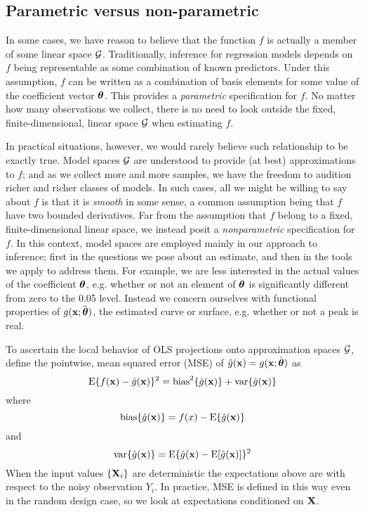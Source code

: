 \subsection{Parametric versus non-parametric}
In some cases, we have reason to believe that the function $f$ is
actually a member of some linear space $\cal G$. Traditionally,
inference for regression models depends on $f$ being representable
as some combination of known predictors. Under this assumption, $f$
can be written as a combination of basis elements for some value of
the coefficient vector $\mbox{\boldmath $\theta$\unboldmath}$. This provides a {\it
parametric} specification for $f$. No matter how many observations we
collect, there is no need to look outside the fixed,
finite-dimensional, linear space $\cal G$ when estimating $f$. 


In practical situations, however, we would rarely believe such
relationship to be exactly true. Model spaces $\cal G$ are understood
to provide (at best) approximations to $f$; and as we collect more and
more samples, we have the freedom to audition richer and richer
classes of models. In such cases, all we might be willing to say about
$f$ is that it is {\it smooth} in some sense, a common assumption
being that $f$ have two bounded derivatives. Far from the assumption
that $f$ belong to a fixed, finite-dimensional linear space, we
instead posit a {\it nonparametric} specification for $f$. In this
context, model spaces are employed mainly in our approach to
inference; first in the questions we pose about an estimate, and then
in the tools we apply to address them. For example, we are less
interested in the actual values of the coefficient $\mbox{\boldmath $\theta$\unboldmath}$,
e.g. whether or not an element of $\mbox{\boldmath $\theta$\unboldmath}$ is significantly
different from zero to the 0.05 level. Instead we concern ourselves
with functional properties of $g({\mathbf x}; \hat{\mbox{\boldmath $\theta$\unboldmath}})$, the
estimated curve or surface, e.g. whether or not a peak is real.

To ascertain the local behavior of OLS projections onto approximation
spaces $\cal G$, define the pointwise, mean squared error (MSE) of
$\hat{g}({\mathbf x}) = g({\mathbf x};\hat{\mbox{\boldmath $\theta$\unboldmath}})$ as 
\[
\mbox{E} \{ f({\mathbf x}) - \hat{g}({\mathbf x}) \}^2 = \mbox{bias}^2\{\hat{g}({\mathbf x})\} +
\mbox{var}\{\hat{g}({\mathbf x})\}
\]
where 
\begin{equation}
\label{bias}
\mbox{bias}\{\hat{g}({\mathbf x})\} = f(x) - \mbox{E}\{\hat{g}({\mathbf x})\}
\end{equation}
and
\[
\mbox{var}\{\hat{g}({\mathbf x})\} = \mbox{E}\{\hat{g}({\mathbf x}) - \mbox{E}[\hat{g}({\mathbf x})]\}^2
\]
When the input values $\{{\mathbf X}_i\}$ are deterministic the expectations
above are with respect to the noisy observation ${Y_i}$. In practice,
MSE is defined in this way even in the random design case, so we look
at expectations conditioned on ${\mathbf X}$. 

